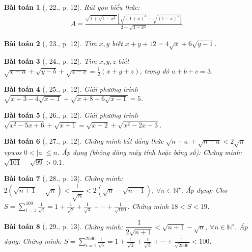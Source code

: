 \documentclass{article}
\newtheorem{baitoan}{Bài toán}
\begin{document}
\begin{baitoan}[\cite{Tuyen_Toan_9}, 22., p. 12]
	Rút gọn biểu thức:
	\begin{align*}
		A = \frac{\sqrt{1 + \sqrt{1 - x^2}}\left[\sqrt{(1 + x)^3} - \sqrt{(1 - x)^3}\right]}{2 + \sqrt{1 - x^2}}.
	\end{align*}
\end{baitoan}

\begin{baitoan}[\cite{Tuyen_Toan_9}, 23., p. 12]
	Tìm $x,y$ biết $x + y + 12 = 4\sqrt{x} + 6\sqrt{y - 1}$.
\end{baitoan}

\begin{baitoan}[\cite{Tuyen_Toan_9}, 24., p. 12]
	Tìm $x,y,z$ biết $\sqrt{x - a} + \sqrt{y - b} + \sqrt{z - c} = \frac{1}{2}(x + y + z)$, trong đó $a + b + c = 3$.
\end{baitoan}

\begin{baitoan}[\cite{Tuyen_Toan_9}, 25., p. 12]
	Giải phương trình $\sqrt{x + 3 - 4\sqrt{x - 1}} + \sqrt{x + 8 + 6\sqrt{x - 1}} = 5$.
\end{baitoan}

\begin{baitoan}[\cite{Tuyen_Toan_9}, 26., p. 12]
	Giải phương trình $\sqrt{x^2 - 5x + 6} + \sqrt{x + 1} = \sqrt{x - 2} + \sqrt{x^2 - 2x - 3}$.
\end{baitoan}

\begin{baitoan}[\cite{Tuyen_Toan_9}, 27., p. 12]
	Chứng minh bất đẳng thức $\sqrt{n + a} + \sqrt{n - a} < 2\sqrt{n}$ vpwos $0 < |a|\le n$. Áp dụng (không dùng máy tính hoặc bảng số): Chứng minh: $\sqrt{101} - \sqrt{99} > 0.1$.
\end{baitoan}

\begin{baitoan}[\cite{Tuyen_Toan_9}, 28., p. 13]
	Chứng minh: $2(\sqrt{n + 1} - \sqrt{n}) < \dfrac{1}{\sqrt{n}} < 2(\sqrt{n} - \sqrt{n - 1})$, $\forall n\in\mathbb{N}^\star$. Áp dụng: Cho $S = \sum_{i=1}^{100} \frac{1}{\sqrt{i}} = 1 + \frac{1}{\sqrt{2}} + \frac{1}{\sqrt{3}} + \cdots + \frac{1}{\sqrt{100}}$. Chứng minh $18 < S < 19$.
\end{baitoan}

\begin{baitoan}[\cite{Tuyen_Toan_9}, 29., p. 13]
	Chứng minh: $\dfrac{1}{2\sqrt{n + 1}} < \sqrt{n + 1} - \sqrt{n}$, $\forall n\in\mathbb{N}^\star$. Áp dụng: Chứng minh: $S = \sum_{i=1}^{2500} \frac{1}{\sqrt{i}} = 1 + \frac{1}{\sqrt{2}} + \frac{1}{\sqrt{3}} + \cdots + \frac{1}{\sqrt{2500}} < 100$.
\end{baitoan}
\end{document}

